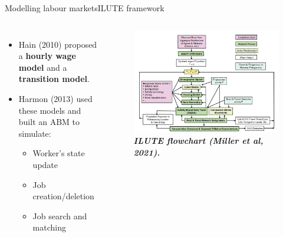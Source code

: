 \documentclass[aspectratio=169, xcolor=dvipsnames]{beamer}
\begin{document}
\begin{frame}{Modelling labour markets}{ILUTE framework}
    \vspace*{-25pt}
    \begin{columns}
            \begin{itemize}
                \setlength{\itemsep}{10pt} %
                \item \fontsize{10pt}{12pt}\selectfont Hain (2010) proposed a \textbf{hourly wage model} and a \textbf{transition model}.
                \item \fontsize{10pt}{12pt}\selectfont Harmon (2013) used these models and built an ABM to simulate:
                \begin{itemize}
                    \item \fontsize{10pt}{12pt}\selectfont Worker's state update
                    \item \fontsize{10pt}{12pt}\selectfont Job creation/deletion
                    \item \fontsize{10pt}{12pt}\selectfont Job search and matching
                \end{itemize}
            \end{itemize}
            \begin{figure}
                \centering
                \includegraphics[width=1.0\textwidth]{./images/ilute.png}
                \captionsetup{labelformat=empty}
                \caption{\fontsize{8pt}{8pt}\selectfont \textbf{\textit{ILUTE flowchart (Miller et al, 2021).}}}
            \end{figure}
    \end{columns}
\end{frame}
\end{document}
